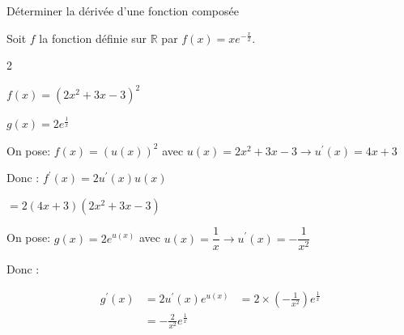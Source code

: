     \begin{bmethodet}{Déterminer la dérivée d'une fonction composée	}
    	
    	Soit $f$ la fonction définie sur $\mathbb{R}$ par $f(x)=x e^{-\frac{x}{2}}$.
    	\begin{multicols}{2}
    		\begin{enumMet}
    			\item $f(x)=\left(2 x^2+3 x-3\right)^2$
    			\item $g(x)=2 e^{\frac{1}{x}}$
    		\end{enumMet}
    	\end{multicols}
    	
    	
    	\begin{enumMet}
    		\item On pose: $f(x)=(u(x))^2$ avec $u(x)=2 x^2+3 x-3 \rightarrow u^{\prime}(x)=4 x+3$
    		
    		Donc : $f^{\prime}(x)=2 u^{\prime}(x) u(x)$
    		
    		$=2(4 x+3)\left(2 x^2+3 x-3\right)$
    		
    		\item On pose: $g(x)=2 e^{u(x)}$ avec $u(x)=\dfrac{1}{x} \rightarrow u^{\prime}(x)=-\dfrac{1}{x^2}$
    		
    		Donc :
    		
    		$$
    		\begin{aligned}
    			g^{\prime}(x)&=2 u^{\prime}(x) e^{u(x)}
    			& =2 \times\left(-\frac{1}{x^2}\right) e^{\frac{1}{x}} \\
    			& =-\frac{2}{x^2} e^{\frac{1}{x}}
    		\end{aligned}
    		$$
    	\end{enumMet}
    \end{bmethodet}
    
